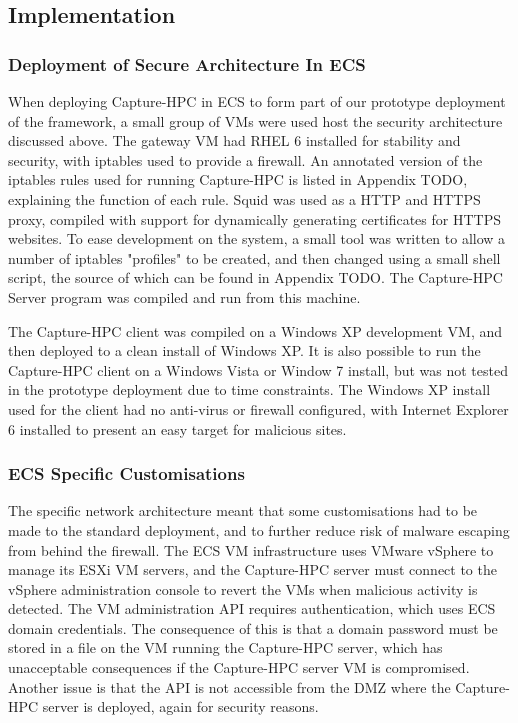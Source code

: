 \subsection{Implementation}

\subsubsection{Deployment of Secure Architecture In ECS}


When deploying Capture-HPC in ECS to form part of our prototype deployment of
the framework, a small group of VMs were used host the security architecture
discussed above. The gateway VM had RHEL 6 installed for stability and security,
with iptables used to provide a firewall. An annotated version of the iptables
rules used for running Capture-HPC is listed in Appendix TODO, explaining the
function of each rule. Squid was used as a HTTP and HTTPS proxy, compiled with
support for dynamically generating certificates for HTTPS websites. To ease 
development on the system, a small tool was written to allow a number of
iptables "profiles" to be created, and then changed using a small shell script,
the source of which can be found in Appendix TODO. The Capture-HPC Server
program was compiled and run from this machine.

The Capture-HPC client was compiled on a Windows XP development VM, and then
deployed to a clean install of Windows XP. It is also possible to run the
Capture-HPC client on a Windows Vista or Window 7 install, but was not tested in
the prototype deployment due to time constraints. The Windows XP install used
for the client had no anti-virus or firewall configured, with Internet Explorer
6 installed to present an easy target for malicious sites.

\subsubsection{ECS Specific Customisations}

The specific network architecture meant that some customisations had to be made
to the standard deployment, and to further reduce risk of malware escaping from
behind the firewall. The ECS VM infrastructure uses VMware vSphere to manage its
ESXi VM servers, and the Capture-HPC server must connect to the vSphere
administration console to revert the VMs when malicious activity is detected.
The VM administration API requires authentication, which uses ECS domain
credentials. The consequence of this is that a domain password must be stored in
a file on the VM running the Capture-HPC server, which has unacceptable
consequences if the Capture-HPC server VM is compromised. Another issue is that
the API is not accessible from the DMZ where the Capture-HPC server is deployed,
again for security reasons.

